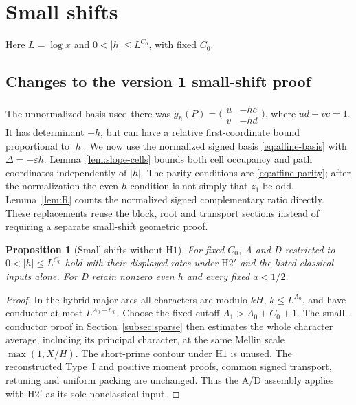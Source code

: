 \documentclass[11pt]{article}
\newtheorem{proposition}[theorem]{Proposition}
\theoremstyle{definition}
\theoremstyle{remark}
\numberwithin{equation}{section}
\begin{document}
\section{Small shifts}\label{sec:small}
Here $L=\log x$ and $0<|h|\le L^{C_0}$, with fixed $C_0$.
\subsection{Changes to the version 1 small-shift proof}\label{subsec:small-major}
The unnormalized basis used there was
$g_h(P)=\bigl(\begin{smallmatrix}u&-hc\\v&-hd\end{smallmatrix}\bigr)$,
where $ud-vc=1$. It has determinant $-h$, but can have a
relative first-coordinate bound proportional to $|h|$.
We now use the normalized signed basis
\eqref{eq:affine-basis} with $\Delta=-\varepsilon h$.
Lemma~\ref{lem:slope-cells} bounds both cell occupancy and path
coordinates independently of $|h|$. The parity conditions are
\eqref{eq:affine-parity}; after the normalization the even-$h$
condition is not simply that $z_1$ be odd. Lemma~\ref{lem:R}
counts the normalized signed complementary ratio directly.
These replacements reuse the block, root and transport sections
instead of requiring a separate small-shift geometric proof.

\begin{proposition}[Small shifts without $\mathrm H1$]\label{prop:small-v2}
For fixed $C_0$, A and D restricted to
$0<|h|\le L^{C_0}$ hold with their displayed rates under
$\mathrm H2'$ and the listed classical inputs alone.
For D retain nonzero even $h$ and every fixed $a<1/2$.
\end{proposition}
\begin{proof}
In the hybrid major arcs all characters are modulo $kH$,
$k\le L^{A_0}$, and have conductor at most $L^{A_0+C_0}$.
Choose the fixed cutoff $A_1>A_0+C_0+1$. The small-conductor
proof in Section~\ref{subsec:sparse} then estimates the whole
character average, including its principal character, at the
same Mellin scale $\max(1,X/H)$. The short-prime contour under
$\mathrm H1$ is unused. The reconstructed Type~I and positive
moment proofs, common signed transport, retuning and uniform
packing are unchanged. Thus the A/D assembly applies with
$\mathrm H2'$ as its sole nonclassical input.
\end{proof}
\end{document}
